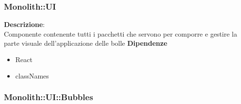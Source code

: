 \clearpage

\subsubsection{Monolith::UI}
\textbf{Descrizione}:\\
 Componente contenente tutti i pacchetti che servono per comporre e gestire la parte visuale dell'applicazione delle bolle
\textbf{Dipendenze}
\begin{itemize}
\item React
\item classNames
\end{itemize} 


\clearpage

\subsubsection{Monolith::UI::Bubbles}
   \FloatBarrier
